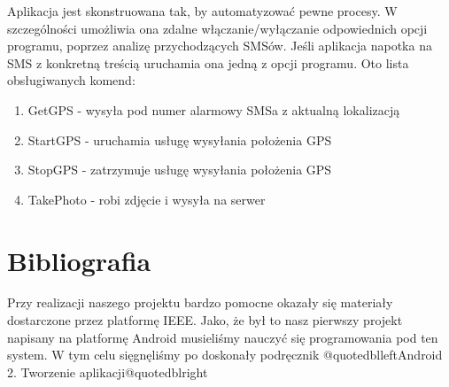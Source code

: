 \documentclass[11pt,a4paper]{article}
\begin{document}
\vspace{10pt}
Aplikacja jest skonstruowana tak, by automatyzować pewne procesy. W szczególności umożliwia ona zdalne włączanie/wyłączanie odpowiednich opcji programu, poprzez analizę przychodzących SMSów. Jeśli aplikacja napotka na SMS z konkretną treścią uruchamia ona jedną z opcji programu. Oto lista obsługiwanych komend:
\begin{enumerate}
\item GetGPS - wysyła pod numer alarmowy SMSa z aktualną lokalizacją 
\item StartGPS - uruchamia usługę wysyłania położenia GPS
\item StopGPS - zatrzymuje usługę wysyłania położenia GPS
\item TakePhoto - robi zdjęcie i wysyła na serwer
\end{enumerate}
\newpage
\section{Bibliografia}
Przy realizacji naszego projektu bardzo pomocne okazały się materiały dostarczone przez platformę IEEE.
\cite{2009UltraDeponti}
\cite{2010ComputingEttinger}
\cite{2011IEEEIntGoldman}
\cite{2011IEEERadioMitchell}
\cite{2009IEEEEngineeringSposaro}
\cite{2011DroidColunas}
\cite{2010IEEEEMBCDoukas}
\cite{2010IEEEEMBCSposaro}
\cite{2009IEEEBIBEWang}
\cite{2010NISSYang}
Jako, że był to nasz pierwszy projekt napisany na platformę Android musieliśmy nauczyć się programowania pod ten system. W tym celu sięgnęliśmy po doskonały podręcznik @quotedblleft{}Android 2. Tworzenie aplikacji@quotedblright{} \cite{2010AndroidHashimi}



\end{document}
